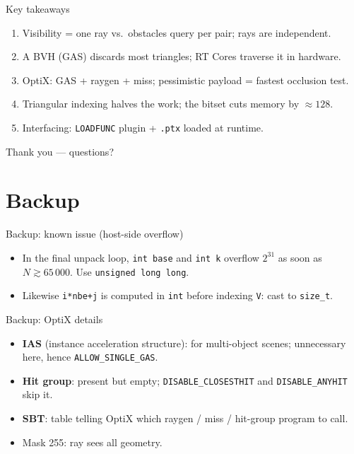 \documentclass[aspectratio=169,10pt]{beamer}
\begin{document}
\begin{frame}{Key takeaways}
  \begin{enumerate}
    \item Visibility = one \alert{ray vs.\ obstacles} query per pair; rays are \alert{independent}.
    \item A \alert{BVH} (GAS) discards most triangles; \alert{RT Cores} traverse it in hardware.
    \item \alert{OptiX}: GAS + raygen + miss; pessimistic payload = fastest occlusion test.
    \item \alert{Triangular indexing} halves the work; the \alert{bitset} cuts memory by $\approx128$.
    \item Interfacing: \texttt{LOADFUNC} plugin + \texttt{.ptx} loaded at runtime.
  \end{enumerate}
  \vspace{2mm}
  \centering Thank you --- questions?
\end{frame}

\appendix
\section{Backup}
\begin{frame}{Backup: known issue (host-side overflow)}
  \begin{itemize}
    \item In the final unpack loop, \texttt{int base} and \texttt{int k} overflow $2^{31}$ as soon as $N\gtrsim65\,000$. Use \texttt{unsigned long long}.
    \item Likewise \texttt{i*nbe+j} is computed in \texttt{int} before indexing \texttt{V}: cast to \texttt{size\_t}.
  \end{itemize}
\end{frame}

\begin{frame}{Backup: OptiX details}
  \begin{itemize}
    \item \textbf{IAS} (instance acceleration structure): for multi-object scenes; unnecessary here, hence \texttt{ALLOW\_SINGLE\_GAS}.
    \item \textbf{Hit group}: present but empty; \texttt{DISABLE\_CLOSESTHIT} and \texttt{DISABLE\_ANYHIT} skip it.
    \item \textbf{SBT}: table telling OptiX which raygen / miss / hit-group program to call.
    \item Mask 255: ray sees all geometry.
  \end{itemize}
\end{frame}
\end{document}
